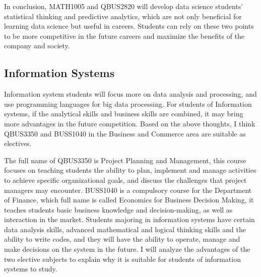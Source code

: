 \documentclass[12pt]{article}
\begin{document}
In conclusion, MATH1005 and QBUS2820 will develop data science students' statistical thinking and predictive analytics, which are not only beneficial for learning data science but useful in careers. Students can rely on these two points to be more competitive in the future careers and maximize the benefits of the company and society.

\newpage
\subsection{Information Systems}


Information system students will focus more on data analysis and processing, and use programming languages for big data processing. For students of Information systems, if the analytical skills and business skills are combined, it may bring more advantages in the future competition. Based on the above thoughts, I think QBUS3350 and BUSS1040 in the Business and Commerce area are suitable as electives.

The full name of QBUS3350 is Project Planning and Management, this course focuses on teaching students the ability to plan, implement and manage activities to achieve specific organizational goals, and discuss the challenges that project managers may encounter. BUSS1040 is a compulsory course for the Department of Finance, which full name is called Economics for Business Decision Making, it teaches students basic business knowledge and decision-making, as well as interaction in the market. Students majoring in information systems have certain data analysis skills, advanced mathematical and logical thinking skills and the ability to write codes, and they will have the ability to operate, manage and make decisions on the system in the future. I will analyze the advantages of the two elective subjects to explain why it is suitable for students of information systems to study.
\end{document}
